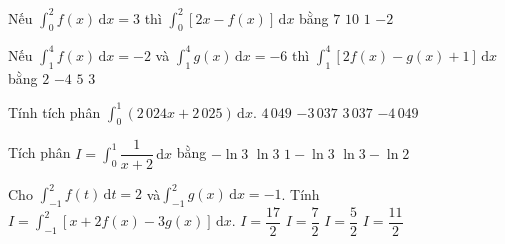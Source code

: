 \begin{ex}%
	Nếu $\displaystyle\int_0^2f(x)\,\mathrm{d}x=3$ thì $\displaystyle\int_0^2[2x-f(x)]\,\mathrm{d}x$ bằng 
	\choice 
		{$7$} 
		 {$10$}
		 {\True $1$}
		{$-2$} 
\end{ex}

\begin{ex}%
	Nếu  $\displaystyle\int_1^4{f(x)} \mathrm{\,d}x=-2$ và $\displaystyle\int_1^4{g(x)} \mathrm{\,d}x=-6$ thì $\displaystyle\int_1^4{\left[2f(x)-g(x)+1\right]} \mathrm{\,d}x$ bằng
	\choice 
		 {$2$}
		{$-4$} 
		{\True  $5$}
		{$3$} 
\end{ex}

\begin{ex}%
	Tính tích  phân $\displaystyle\int_0^1(2\,024x+2\,025)\,\mathrm{d}x$.
	\choice 
		{$4\,049$} 
		{$-3\,037$} 
		{\True  $3\,037$}
		 {$-4\,049$}
\end{ex}

\begin{ex}%
	Tích phân  $I=\displaystyle\int_0^1{\dfrac1{x+2}\mathrm{\,d}x}$ bằng
	\choice 
		 {$-\ln 3$}
		{$\ln 3$} 
		{$1-\ln  3$}
		{\True $\ln 3-\ln 2$} 
\end{ex}

\begin{ex}%
	Cho $\displaystyle\int_{-1}^2{f\left(t\right)} \mathrm{\,d}t=2$ và$\displaystyle\int_{-1}^2{g(x)}\mathrm{\,d}x=-1$. Tính  $I=\displaystyle\int_{-1}^2{\left[x+2f(x)-3g(x)\right]}\mathrm{\,d}x$.
	 \choice
		 {\True $I=\dfrac{17}2$}
		{$I=\dfrac72$} 
		{$I=\dfrac52$} 
		{$I=\dfrac{11}2$} 
\end{ex}

